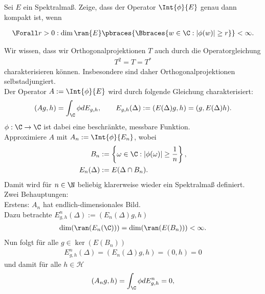 \begin{exercise}[34/1]

Sei $E$ ein Spektralmaß.
Zeige, dass der Operator $\Int{\phi}{E}$ genau dann kompakt ist, wenn

\begin{align*}
  \Forall r > 0:
  \dim{\ran{E}}
  \pbraces
  {
    \Bbraces
    {
      w \in \C:
      |\phi(w)| \geq r
    }
  }
  < \infty.
\end{align*}

\end{exercise}

\begin{solution}
Wir wissen, dass wir Orthogonalprojektionen $T$ auch durch die Operatorgleichung
\begin{align*}
  T^2 = T = T^*
\end{align*}
charakterisieren können. Insbesondere sind daher Orthogonalprojektionen selbstadjungiert. \\
Der Operator $A := \Int{\phi}{E}$ wird durch folgende Gleichung charakterisiert:
\begin{align}
  \left(Ag,h\right) = \int_{\C}\phi dE_{g,h}, \qquad E_{g,h}(\Delta) := (E(\Delta)g,h) = (g,E(\Delta)h).
\end{align}
$\phi: \C \to \C$ ist dabei eine beschränkte, messbare Funktion. \\
Approximiere $A$ mit $A_n := \Int{\phi}{E_n}$, wobei
\begin{align*}
  B_n &:= \left\{\omega \in \C: |\phi(\omega)| \geq \frac{1}{n}\right\}, \\
  E_n(\Delta) &:= E(\Delta \cap B_n).
\end{align*}
Damit wird für $n \in \N$ beliebig klarerweise wieder ein Spektralmaß definiert. \\
Zwei Behauptungen: \\
Erstens: $A_n$ hat endlich-dimensionales Bild. \\
Dazu betrachte $E_{g,h}^n(\Delta) := (E_n(\Delta)g,h)$
\begin{align*}
  \dim (\ran(E_n(\C))) = \dim (\ran(E(B_n))) < \infty.
\end{align*}
Nun folgt für alle $g \in \ker(E(B_n))$
\begin{align*}
  E_{g,h}^n(\Delta) = (E_n(\Delta)g,h) = (0,h) = 0
\end{align*}
und damit für alle $h \in \mathcal{H}$
\begin{align*}
  (A_ng,h) = \int_{\C}\phi dE_{g,h}^n = 0,
\end{align*}

\end{solution}
